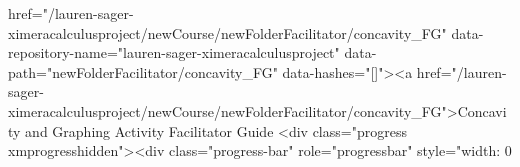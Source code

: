 href="/lauren-sager-ximeracalculusproject/newCourse/newFolderFacilitator/concavity_FG" data-repository-name="lauren-sager-ximeracalculusproject" data-path="newFolderFacilitator/concavity_FG" data-hashes="[]"><a href="/lauren-sager-ximeracalculusproject/newCourse/newFolderFacilitator/concavity_FG">Concavity and Graphing Activity Facilitator Guide <div class="progress xmprogresshidden"><div class="progress-bar" role="progressbar" style="width: 0%